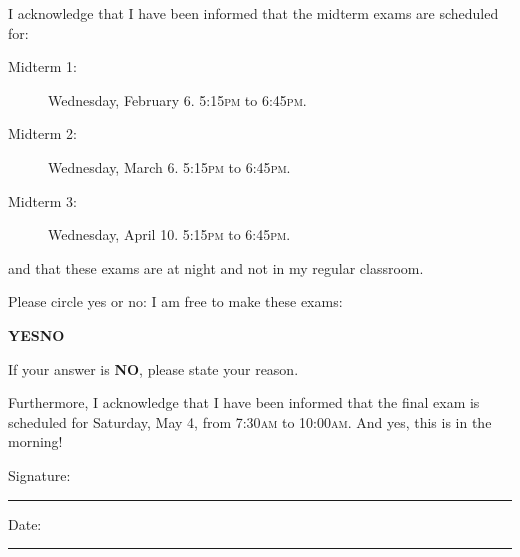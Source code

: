 \documentclass[11pt]{article}
\begin{document}
\pagestyle{empty}

\drawtitle

\noindent I acknowledge that I have been informed that the midterm
exams are scheduled for:
\begin{description}
\item[Midterm 1:] Wednesday, February 6. 5:15\textsc{pm} to
  6:45\textsc{pm}.
\item[Midterm 2:] Wednesday, March 6. 5:15\textsc{pm} to
  6:45\textsc{pm}.
\item[Midterm 3:] Wednesday, April 10. 5:15\textsc{pm} to
  6:45\textsc{pm}.
\end{description}
and that these exams are at night and not in my regular classroom.

\vspace{.25in}

\noindent Please circle yes or no: I am free to make these exams:

\vspace{.25in}
\begin{center}
\textbf{YES}\hspace{1.5in}\textbf{NO}
\end{center}
\vspace{.25in}

\noindent If your answer is \textbf{NO}, please state your reason.

\vfill

\noindent Furthermore, I acknowledge that I have been informed that
the final exam is scheduled for Saturday, May 4, from 7:30\textsc{am}
to 10:00\textsc{am}. And yes, this is in the morning!

\vspace{1in}

\noindent Signature:~\rule{3.5in}{0.01em} \hfill
Date:~\rule{1.5in}{0.01em}
\end{document}
